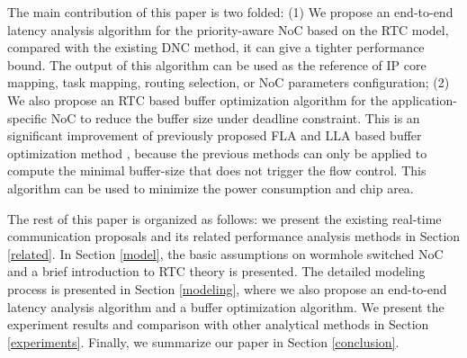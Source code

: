 \documentclass[10pt,journal]{IEEEtran}
\begin{document}
The main contribution of this paper is two folded: (1) We propose an end-to-end latency analysis algorithm for the priority-aware NoC based on the RTC model, compared with the existing DNC \cite{Qian489900} method, it can give a tighter performance bound. The output of this algorithm can be used as the reference of IP core mapping, task mapping, routing selection, or NoC parameters configuration; (2) We also propose an RTC based buffer optimization algorithm for the application-specific NoC to reduce the buffer size under deadline constraint. This is an significant improvement of previously proposed FLA and LLA based buffer optimization method \cite{189}, because the previous methods can only be applied to compute the minimal buffer-size that does not trigger the flow control. This algorithm can be used to minimize the power consumption and chip area.

The rest of this paper is organized as follows: we present the existing real-time communication proposals and its related performance analysis methods in Section \ref{related}. In Section \ref{model}, the basic assumptions on wormhole switched NoC and a brief introduction to RTC theory is presented. The detailed modeling process is presented in Section \ref{modeling}, where we also propose an end-to-end latency analysis algorithm and a buffer optimization algorithm. We present the experiment results and comparison with other analytical methods in Section \ref{experiments}. Finally, we summarize our paper in Section \ref{conclusion}.
\end{document}
